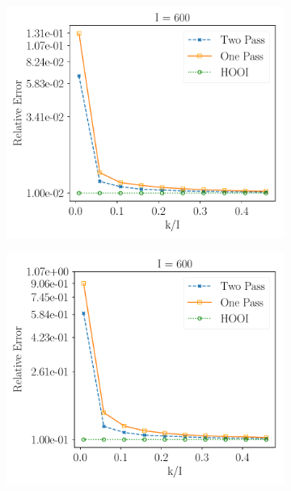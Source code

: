 \begin{figure}[H] 
    \centering 
    \begin{subfigure}{0.32\textwidth}
    \includegraphics[scale = 0.3]{figure/id_lnoise_n600.pdf}
    \end{subfigure}
    \begin{subfigure}{0.32\textwidth}
    \includegraphics[scale = 0.3]{figure/id_mnoise_n600.pdf}
    \end{subfigure}
    \begin{subfigure}{0.32\textwidth}

\end{subfigure}
\end{figure}
